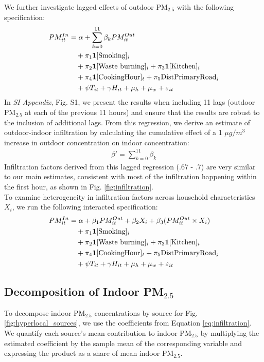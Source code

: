 \documentclass[9pt,twocolumn,twoside]{pnas-new}
\begin{document}
We further investigate lagged effects of outdoor PM$_{2.5}$ with the following specification:
\begin{align}
     PM^{In}_{it} &= \alpha + \sum_{k = 0}^{11}\beta_k PM^{Out}_{it} \\
     &\quad+ \pi_1 \mathbf{1}[\text{Smoking}]_i  \notag \\ &\quad+ \pi_2 \mathbf{1}[\text{Waste burning}]_i + \pi_3 \mathbf{1}[\text{Kitchen}]_i \notag \\ &\quad + \pi_4 \mathbf{1}[\text{CookingHour}]_t + \pi_5 \text{DistPrimaryRoad}_i \notag \\ &\quad+ \psi T_{it} + \gamma H_{it} + \mu_h + \mu_w + \varepsilon_{it} \notag
\end{align}
In \textit{SI Appendix}, Fig. S1, we present the results when including 11 lags (outdoor PM$_{2.5}$ at each of the previous 11 hours) and ensure that the results are robust to the inclusion of additional lags. From this regression, we derive an estimate of outdoor-indoor infiltration by calculating the cumulative effect of a 1 $\mu g/m^3$ increase in outdoor concentration on indoor concentration:
\begin{align}
    \beta' = \sum_{k=0}^11 \beta_k
\end{align}
Infiltration factors derived from this lagged regression (.67 - .7) are very similar to our main estimates, consistent with most of the infiltration happening within the first hour, as shown in Fig. \ref{fig:infiltration}.
\\

To examine heterogeneity in infiltration factors across household characteristics $X_i$, we run the following interacted specification:
\begin{align}
    PM^{In}_{it} &= \alpha + \beta_1 PM^{Out}_{it} + \beta_2 X_i + \beta_3(PM^{Out}_{it} \times X_i) \\ 
    &\quad + \pi_1 \mathbf{1}[\text{Smoking}]_i  \notag \\
    &\quad + \pi_2 \mathbf{1}[\text{Waste burning}]_i \notag + \pi_3 \mathbf{1}[\text{Kitchen}]_i \\ &\quad + \pi_4 \mathbf{1}[\text{CookingHour}]_t \notag + \pi_5 \text{DistPrimaryRoad}_i \\ &\quad + \psi T_{it} + \gamma H_{it} + \mu_h + \mu_w + \varepsilon_{it} \notag
\end{align}


\subsection{Decomposition of Indoor PM$_{2.5}$}
To decompose indoor PM$_{2.5}$ concentrations by source for Fig. \ref{fig:hyperlocal_sources}, we use the coefficients from Equation \ref{eq:infiltration}. We quantify each source's mean contribution to indoor PM$_{2.5}$ by multiplying the estimated coefficient by the sample mean of the corresponding variable and expressing the product as a share of mean indoor PM$_{2.5}$. 
\end{document}
